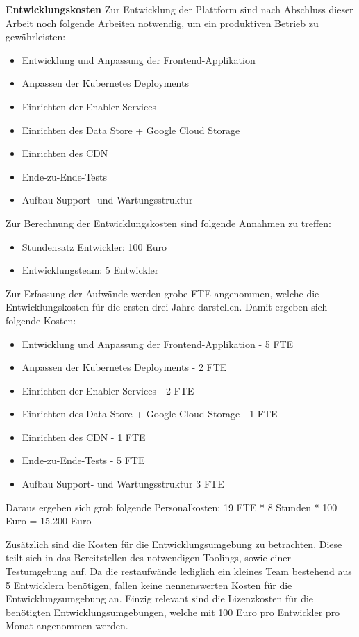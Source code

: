 \textbf{Entwicklungskosten}\newline
Zur Entwicklung der Plattform sind nach Abschluss dieser Arbeit noch folgende Arbeiten notwendig, um ein produktiven Betrieb zu gewährleisten:
\begin{itemize}
    \item Entwicklung und Anpassung der Frontend-Applikation
    \item Anpassen der Kubernetes Deployments
    \item Einrichten der Enabler Services
    \item Einrichten des Data Store + Google Cloud Storage
    \item Einrichten des \ac{CDN}
    \item Ende-zu-Ende-Tests
    \item Aufbau Support- und Wartungsstruktur
\end{itemize}

Zur Berechnung der Entwicklungskosten sind folgende Annahmen zu treffen:
\begin{itemize}
    \item Stundensatz Entwickler: 100 Euro
    \item Entwicklungsteam: 5 Entwickler
\end{itemize}

Zur Erfassung der Aufwände werden grobe \ac{FTE} angenommen, welche die Entwicklungskosten für die ersten drei Jahre darstellen.
Damit ergeben sich folgende Kosten:
\begin{itemize}
    \item Entwicklung und Anpassung der Frontend-Applikation - 5 \ac{FTE}
    \item Anpassen der Kubernetes Deployments - 2 \ac{FTE}
    \item Einrichten der Enabler Services - 2 \ac{FTE}
    \item Einrichten des Data Store + Google Cloud Storage - 1 \ac{FTE}
    \item Einrichten des CDN - 1 \ac{FTE}
    \item Ende-zu-Ende-Tests - 5 \ac{FTE}
    \item Aufbau Support- und Wartungsstruktur 3 \ac{FTE}
\end{itemize}

Daraus ergeben sich grob folgende Personalkosten:
19 \ac{FTE} * 8 Stunden * 100 Euro = 15.200 Euro

Zusätzlich sind die Kosten für die Entwicklungsumgebung zu betrachten.
Diese teilt sich in das Bereitstellen des notwendigen Toolings, sowie einer Testumgebung auf.
Da die restaufwände lediglich ein kleines Team bestehend aus 5 Entwicklern benötigen, fallen keine nennenswerten Kosten für die Entwicklungsumgebung an.
Einzig relevant sind die Lizenzkosten für die benötigten Entwicklungsumgebungen, welche mit 100 Euro pro Entwickler pro Monat angenommen werden.


